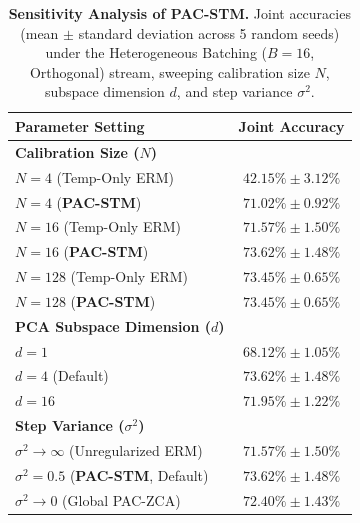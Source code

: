 \begin{table}[h]
\caption{\textbf{Sensitivity Analysis of PAC-STM.} Joint accuracies (mean $\pm$ standard deviation across 5 random seeds) under the Heterogeneous Batching ($B=16$, Orthogonal) stream, sweeping calibration size $N$, subspace dimension $d$, and step variance $\sigma^2$.}
\label{tab:sensitivity}
\begin{center}
\begin{small}
\begin{sc}
\begin{tabular}{lc}
\toprule
Parameter Setting & Joint Accuracy \\
\midrule
\textnormal{\textbf{Calibration Size ($N$)}} & \\
\textnormal{\quad $N=4$ (Temp-Only ERM)} & $42.15\% \pm 3.12\%$ \\
\textnormal{\quad $N=4$ (\textbf{PAC-STM})} & $71.02\% \pm 0.92\%$ \\
\textnormal{\quad $N=16$ (Temp-Only ERM)} & $71.57\% \pm 1.50\%$ \\
\textnormal{\quad $N=16$ (\textbf{PAC-STM})} & $73.62\% \pm 1.48\%$ \\
\textnormal{\quad $N=128$ (Temp-Only ERM)} & $73.45\% \pm 0.65\%$ \\
\textnormal{\quad $N=128$ (\textbf{PAC-STM})} & $73.45\% \pm 0.65\%$ \\
\midrule
\textnormal{\textbf{PCA Subspace Dimension ($d$)}} & \\
\textnormal{\quad $d=1$} & $68.12\% \pm 1.05\%$ \\
\textnormal{\quad $d=4$ (Default)} & $73.62\% \pm 1.48\%$ \\
\textnormal{\quad $d=16$} & $71.95\% \pm 1.22\%$ \\
\midrule
\textnormal{\textbf{Step Variance ($\sigma^2$)}} & \\
\textnormal{\quad $\sigma^2 \to \infty$ (Unregularized ERM)} & $71.57\% \pm 1.50\%$ \\
\textnormal{\quad $\sigma^2 = 0.5$ (\textbf{PAC-STM}, Default)} & $73.62\% \pm 1.48\%$ \\
\textnormal{\quad $\sigma^2 \to 0$ (Global PAC-ZCA)} & $72.40\% \pm 1.43\%$ \\
\bottomrule
\end{tabular}
\end{sc}
\end{small}
\end{center}
\vskip -0.1in
\end{table}

